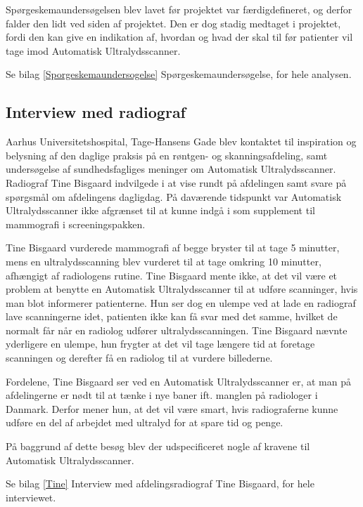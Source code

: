 Spørgeskemaundersøgelsen blev lavet før projektet var færdigdefineret, og derfor falder den lidt ved siden af projektet. Den er dog stadig medtaget i projektet, fordi den kan give en indikation af, hvordan og hvad der skal til før patienter vil tage imod Automatisk Ultralydsscanner. 

Se bilag \ref{Sporgeskemaundersogelse} Spørgeskemaundersøgelse, for hele analysen. 

\subsection{Interview med radiograf} 
Aarhus Universitetshospital, Tage-Hansens Gade blev kontaktet til inspiration og belysning af den daglige praksis på en røntgen- og skanningsafdeling, samt undersøgelse af sundhedsfagliges meninger om Automatisk Ultralydsscanner. Radiograf Tine Bisgaard indvilgede i at vise rundt på afdelingen samt svare på spørgsmål om afdelingens dagligdag. På daværende tidspunkt var Automatisk Ultralydsscanner ikke afgrænset til at kunne indgå i som supplement til mammografi i screeningspakken. 

Tine Bisgaard vurderede mammografi af begge bryster til at tage 5 minutter, mens en ultralydsscanning blev vurderet til at tage omkring 10 minutter, afhængigt af radiologens rutine. Tine Bisgaard mente ikke, at det vil være et problem at benytte en Automatisk Ultralydsscanner til at udføre scanninger, hvis man blot informerer patienterne. Hun ser dog en ulempe ved at lade en radiograf lave scanningerne idet, patienten ikke kan få svar med det samme, hvilket de normalt får når en radiolog udfører ultralydsscanningen. Tine Bisgaard nævnte yderligere en ulempe, hun frygter at det vil tage længere tid at foretage scanningen og derefter få en radiolog til at vurdere billederne.

Fordelene, Tine Bisgaard ser ved en Automatisk Ultralydsscanner er, at man på afdelingerne er nødt til at tænke i nye baner ift. manglen på radiologer i Danmark. Derfor mener hun, at det vil være smart, hvis radiograferne kunne udføre en del af arbejdet med ultralyd for at spare tid og penge.

På baggrund af dette besøg blev der udspecificeret nogle af kravene til Automatisk Ultralydsscanner.

Se bilag \ref{Tine} Interview med afdelingsradiograf Tine Bisgaard, for hele interviewet. 

